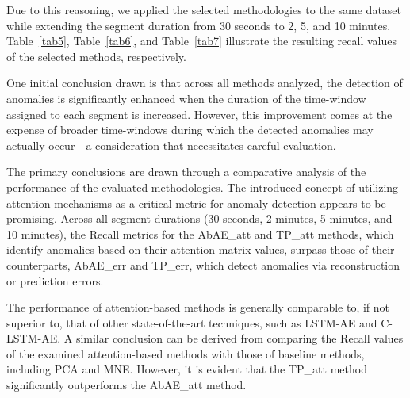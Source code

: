 \documentclass[conference]{IEEEtran}
\begin{document}
Due to this reasoning, we applied the selected methodologies to the same dataset while extending the segment duration from 30 seconds to 2, 5, and 10 minutes. Table~\ref{tab5}, Table~\ref{tab6}, and Table~\ref{tab7} illustrate the resulting recall values of the selected methods, respectively. 

One initial conclusion drawn is that across all methods analyzed, the detection of anomalies is significantly enhanced when the duration of the time-window assigned to each segment is increased. However, this improvement comes at the expense of broader time-windows during which the detected anomalies may actually occur---a consideration that necessitates careful evaluation. 

The primary conclusions are drawn through a comparative analysis of the performance of the evaluated methodologies. The introduced concept of utilizing attention mechanisms as a critical metric for anomaly detection appears to be promising. Across all segment durations (30 seconds, 2 minutes, 5 minutes, and 10 minutes), the Recall metrics for the AbAE\_att and TP\_att methods, which identify anomalies based on their attention matrix values, surpass those of their counterparts, AbAE\_err and TP\_err, which detect anomalies via reconstruction or prediction errors.

The performance of attention-based methods is generally comparable to, if not superior to, that of other state-of-the-art techniques, such as LSTM-AE and C-LSTM-AE. A similar conclusion can be derived from comparing the Recall values of the examined attention-based methods with those of baseline methods, including PCA and MNE. However, it is evident that the TP\_att method significantly outperforms the AbAE\_att method.
\end{document}
